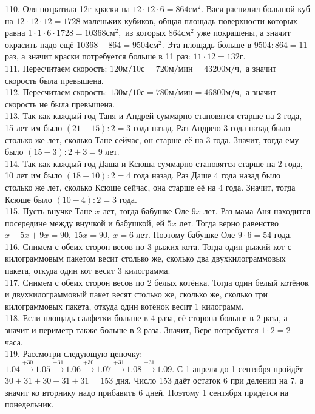 \documentclass[12pt]{article}
\begin{document}
110. Оля потратила 12г краски на $12\cdot12\cdot6=864\text{см}^2.$ Вася распилил большой куб на $12\cdot12\cdot12=1728$ маленьких кубиков, общая площадь поверхности которых равна $1\cdot1\cdot6\cdot1728=10368\text{см}^2,$ из которых $864\text{см}^2$ уже покрашены, а значит окрасить надо ещё $10368-864=9504\text{см}^2.$ Эта площадь больше в $9504:864=11$ раз, а значит краски потребуется больше в 11 раз: $11\cdot12=132$г.\\
111. Пересчитаем скорость: $120\text{м}/10\text{с}=720\text{м}/\text{мин}=43200\text{м}/\text{ч},$ а значит скорость была превышена.\\
112. Пересчитаем скорость: $130\text{м}/10\text{с}=780\text{м}/\text{мин}=46800\text{м}/\text{ч},$ а значит скорость не была превышена.\\
113. Так как каждый год Таня и Андрей суммарно становятся старше на 2 года, 15 лет им было $(21-15):2=3$ года назад. Раз Андрею 3 года назад было столько же лет, сколько Тане сейчас, он старше её на 3 года. Значит, тогда ему было $(15-3):2+3=9$ лет.\\
114. Так как каждый год Даша и Ксюша суммарно становятся старше на 2 года, 10 лет им было $(18-10):2=4$ года назад. Раз Даше 4 года назад было столько же лет, сколько Ксюше сейчас, она старше её на 4 года. Значит, тогда Ксюше было $(10-4):2=3$ года.\\
115. Пусть внучке Тане $x$ лет, тогда бабушке Оле $9x$ лет. Раз мама Аня находится посередине между внучкой и бабушкой, ей $5x$ лет. Тогда верно равенство $x+5x+9x=90,\ 15x=90,\ x=6$ лет. Поэтому бабушке Оле $9\cdot6=54$ года.\\
116. Снимем с обеих сторон весов по 3 рыжих кота. Тогда один рыжий кот с килограммовым пакетом весит столько же, сколько два двухкилограммовых пакета, откуда один кот весит 3 килограмма.\\
117. Снимем с обеих сторон весов по 2 белых котёнка. Тогда один белый котёнок и двухкилограммовый пакет весят столько же, сколько же, сколько три килограммовых пакета, откуда один котёнок весит 1 килограмм.\\
118. Если площадь салфетки больше в 4 раза, её сторона больше в 2 раза, а значит и периметр также больше в 2 раза. Значит, Вере потребуется $1\cdot2=2$ часа.\\
119. Рассмотри следующую цепочку: $1.04\stackrel{+30}{\rightarrow}1.05\stackrel{+31}{\rightarrow}1.06\stackrel{+30}{\rightarrow}1.07\stackrel{+31}{\rightarrow}1.08\stackrel{+31}{\rightarrow}1.09.$
С 1 апреля до 1 сентября пройдёт $30+31+30+31+31=153$ дня. Число 153 даёт остаток 6 при делении на 7, а значит ко вторнику надо прибавить 6 дней. Поэтому 1 сентября придётся на понедельник.\\
\end{document}
